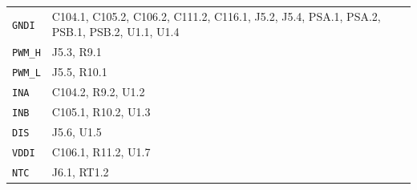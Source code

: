 \begin{longtable}{@{}lp{}@{}}
\texttt{GNDI} & \small C104.1, C105.2, C106.2, C111.2, C116.1, J5.2, J5.4, PSA.1, PSA.2, PSB.1, PSB.2, U1.1, U1.4 \\
\texttt{PWM\_H} & \small J5.3, R9.1 \\
\texttt{PWM\_L} & \small J5.5, R10.1 \\
\texttt{INA} & \small C104.2, R9.2, U1.2 \\
\texttt{INB} & \small C105.1, R10.2, U1.3 \\
\texttt{DIS} & \small J5.6, U1.5 \\
\texttt{VDDI} & \small C106.1, R11.2, U1.7 \\
\texttt{NTC} & \small J6.1, RT1.2 \\
\bottomrule
\end{longtable}